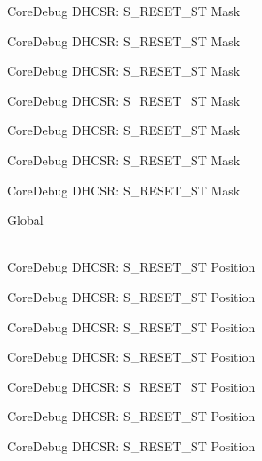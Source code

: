 \begin{DoxyRefList}
\label{deprecated__deprecated000110}%
%
Core\+Debug DHCSR\+: S\+\_\+\+RESET\+\_\+\+ST Mask 

\label{deprecated__deprecated000164}%
%
Core\+Debug DHCSR\+: S\+\_\+\+RESET\+\_\+\+ST Mask 

\label{deprecated__deprecated000249}%
%
Core\+Debug DHCSR\+: S\+\_\+\+RESET\+\_\+\+ST Mask 

\label{deprecated__deprecated000306}%
%
Core\+Debug DHCSR\+: S\+\_\+\+RESET\+\_\+\+ST Mask 

\label{deprecated__deprecated000382}%
%
Core\+Debug DHCSR\+: S\+\_\+\+RESET\+\_\+\+ST Mask 

\label{deprecated__deprecated000461}%
%
Core\+Debug DHCSR\+: S\+\_\+\+RESET\+\_\+\+ST Mask 

\label{deprecated__deprecated000563}%
%
Core\+Debug DHCSR\+: S\+\_\+\+RESET\+\_\+\+ST Mask  
\item[{\parbox[t]{\linewidth}{Global \doxylink{group___c_m_s_i_s___core_debug_ga6f934c5427ea057394268e541fa97753}{Core\+Debug\+\_\+\+DHCSR\+\_\+\+S\+\_\+\+RESET\+\_\+\+ST\+\_\+\+Pos} }}]\hfill \\
\label{deprecated__deprecated000009}%
%
Core\+Debug DHCSR\+: S\+\_\+\+RESET\+\_\+\+ST Position 

\label{deprecated__deprecated000109}%
%
Core\+Debug DHCSR\+: S\+\_\+\+RESET\+\_\+\+ST Position 

\label{deprecated__deprecated000163}%
%
Core\+Debug DHCSR\+: S\+\_\+\+RESET\+\_\+\+ST Position 

\label{deprecated__deprecated000248}%
%
Core\+Debug DHCSR\+: S\+\_\+\+RESET\+\_\+\+ST Position 

\label{deprecated__deprecated000305}%
%
Core\+Debug DHCSR\+: S\+\_\+\+RESET\+\_\+\+ST Position 

\label{deprecated__deprecated000381}%
%
Core\+Debug DHCSR\+: S\+\_\+\+RESET\+\_\+\+ST Position 

\label{deprecated__deprecated000460}%
%
Core\+Debug DHCSR\+: S\+\_\+\+RESET\+\_\+\+ST Position 


\end{DoxyRefList}
